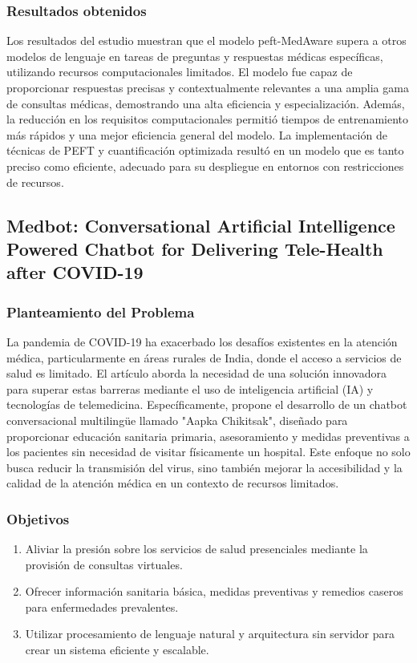 		\subsubsection{Resultados obtenidos}
			Los resultados del estudio muestran que el modelo peft-MedAware supera a otros modelos de lenguaje en tareas de preguntas y respuestas médicas específicas, utilizando recursos computacionales limitados. El modelo fue capaz de proporcionar respuestas precisas y contextualmente relevantes a una amplia gama de consultas médicas, demostrando una alta eficiencia y especialización. Además, la reducción en los requisitos computacionales permitió tiempos de entrenamiento más rápidos y una mejor eficiencia general del modelo. La implementación de técnicas de PEFT y cuantificación optimizada resultó en un modelo que es tanto preciso como eficiente, adecuado para su despliegue en entornos con restricciones de recursos.

\subsection{Medbot: Conversational Artificial Intelligence Powered Chatbot for Delivering Tele-Health after COVID-19 \citep*{Medbot-2020}} 

		\subsubsection{Planteamiento del Problema}
		La pandemia de COVID-19 ha exacerbado los desafíos existentes en la atención médica, particularmente en áreas rurales de India, donde el acceso a servicios de salud es limitado. El artículo aborda la necesidad de una solución innovadora para superar estas barreras mediante el uso de inteligencia artificial (IA) y tecnologías de telemedicina. Específicamente, propone el desarrollo de un chatbot conversacional multilingüe llamado "Aapka Chikitsak", diseñado para proporcionar educación sanitaria primaria, asesoramiento y medidas preventivas a los pacientes sin necesidad de visitar físicamente un hospital. Este enfoque no solo busca reducir la transmisión del virus, sino también mejorar la accesibilidad y la calidad de la atención médica en un contexto de recursos limitados.
		
	\subsubsection{Objetivos}
		\begin{enumerate}
			\item Aliviar la presión sobre los servicios de salud presenciales mediante la provisión de consultas virtuales.\vspace{-2mm}
			\item Ofrecer información sanitaria básica, medidas preventivas y remedios caseros para enfermedades prevalentes.\vspace{-2mm}
			\item Utilizar procesamiento de lenguaje natural y arquitectura sin servidor para crear un sistema eficiente y escalable.\vspace{-2mm}
			\end{enumerate}
			
